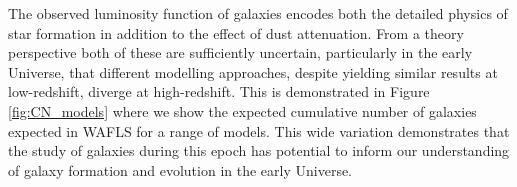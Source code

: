 \documentclass[12pt]{article}
\begin{document}














The observed luminosity function of galaxies encodes both the  detailed physics of star formation in addition to the effect of dust attenuation. From a theory perspective both of these are sufficiently uncertain, particularly in the early Universe, that different modelling approaches, despite yielding similar results at low-redshift, diverge at high-redshift. This is demonstrated in Figure \ref{fig:CN_models} where we show the expected cumulative number of galaxies expected in WAFLS for a range of models. This wide variation demonstrates that the study of galaxies during this epoch has potential to inform our understanding of galaxy formation and evolution in the early Universe.
\end{document}

